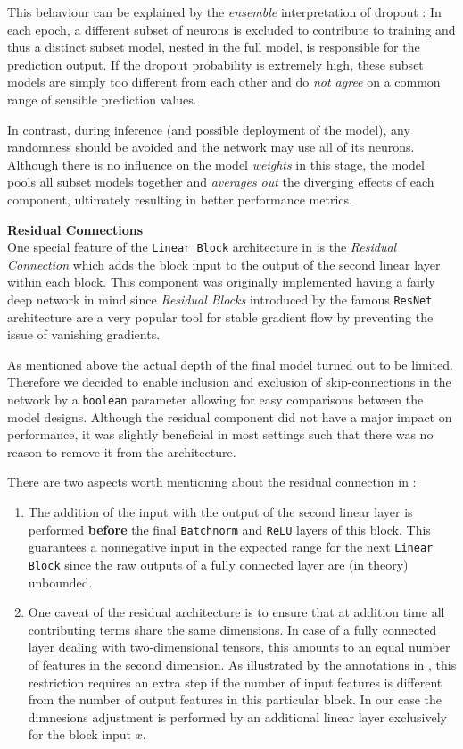 This behaviour can be explained by the \emph{ensemble} interpretation of dropout \citep{goodfellow2016}:
In each epoch, a different subset of neurons is excluded to contribute to training and thus a distinct subset model, nested in the full model, is responsible for the prediction output.
If the dropout probability is extremely high, these subset models are simply too different from each other and do \emph{not agree} on a common range of sensible prediction values.

In contrast, during inference (and possible deployment of the model), any randomness should be avoided and the network may use all of its neurons.
Although there is no influence on the model \emph{weights} in this stage, the model pools all subset models together and \emph{averages out} the diverging effects of each component, ultimately resulting in better performance metrics.

\textbf{Residual Connections} \\
One special feature of the \texttt{Linear Block} architecture in  is the \emph{Residual Connection} which adds the block input to the output of the second linear layer within each block.
This component was originally implemented having a fairly deep network in mind since \emph{Residual Blocks} introduced by the famous \texttt{ResNet} architecture \citep{he2015} are a very popular tool for stable gradient flow by preventing the issue of vanishing gradients.

As mentioned above the actual depth of the final model turned out to be limited.
Therefore we decided to enable inclusion and exclusion of skip-connections in the network by a \texttt{boolean} parameter allowing for easy comparisons between the model designs.
Although the residual component did not have a major impact on performance, it was slightly beneficial in most settings such that there was no reason to remove it from the architecture.

There are two aspects worth mentioning about the residual connection in :
\begin{enumerate}
  \item The addition of the input with the output of the second linear layer is performed \textbf{before} the final \texttt{Batchnorm} and \texttt{ReLU} layers of this block.
        This guarantees a nonnegative input in the expected range for the next \texttt{Linear Block} since the raw outputs of a fully connected layer are (in theory) unbounded.

  \item One caveat of the residual architecture is to ensure that at addition time all contributing terms share the same dimensions.
        In case of a fully connected layer dealing with two-dimensional tensors, this amounts to an equal number of features in the second dimension.
        As illustrated by the annotations in , this restriction requires an extra step if the number of input features is different from the number of output features in this particular block.
        In our case the dimnesions adjustment is performed by an additional linear layer exclusively for the block input $x$.
\end{enumerate}

